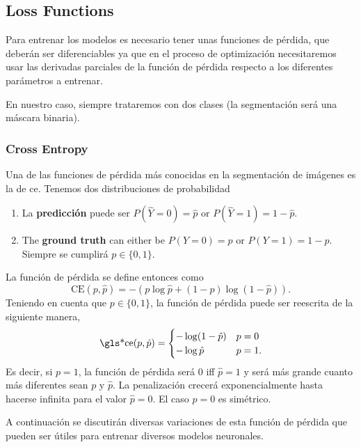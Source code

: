 \subsection{Loss Functions}

Para entrenar los modelos es necesario tener unas funciones de pérdida, que
deberán ser diferenciables ya que en el proceso de optimización necesitaremos
usar las derivadas parciales de la función de pérdida respecto a los diferentes
parámetros a entrenar.

En nuestro caso, siempre trataremos con dos clases (la segmentación será una
máscara binaria).

\subsubsection{Cross Entropy}
Una de las funciones de pérdida más conocidas en la segmentación de imágenes es
la de \gls{ce}. Tenemos dos distribuciones de probabilidad

\begin{enumerate}
  \item La \textbf{predicción} puede ser \(P(\hat{Y} = 0) = \hat{p}\) or
  \(P(\hat{Y} = 1) = 1 - \hat{p}\).
  \item The \textbf{ground truth} can either be \(P(Y = 0) = p\) or
  \(P(Y = 1) = 1 - p\). Siempre se cumplirá \(p \in \{0, 1\}\).
\end{enumerate}

La función de pérdida se define entonces como
\begin{equation}
  \text{CE}(p, \hat{p}) = -(p\log\hat{p} + (1 - p)\log(1 - \hat{p})).
\end{equation}
Teniendo en cuenta que \(p \in \{0, 1\}\), la función de pérdida puede ser
reescrita de la siguiente manera,
\begin{equation}
  \text{\gls*{ce}}(p, \hat{p}) =
  \begin{cases}
    -\log(1 - \hat{p}) & p = 0 \\
    -\log\hat{p} & p = 1.
  \end{cases}
\end{equation}
Es decir, si \(p = 1\), la función de pérdida será \(0\) \gls{iff} \(\hat{p} =
1\) y será más grande cuanto más diferentes sean \(p\) y \(\hat{p}\). La
penalización crecerá exponencialmente hasta hacerse infinita para el valor
\(\hat{p} = 0\). El caso \(p = 0\) es simétrico.

A continuación se discutirán diversas variaciones de esta función de pérdida
que pueden ser útiles para entrenar diversos modelos neuronales.

